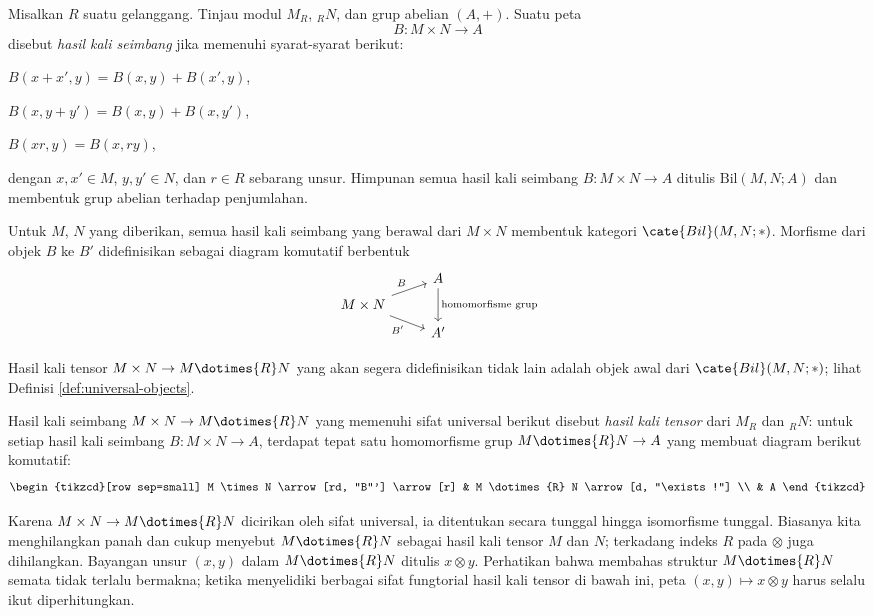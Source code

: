 \begin{definition}\label{def:balanced-product}
	Misalkan $R$ suatu gelanggang. Tinjau modul $M_R$, ${}_R N$, dan grup abelian $(A, +)$. Suatu peta
	\[ B: M \times N \to A \]
	disebut \emph{hasil kali seimbang} jika memenuhi syarat-syarat berikut:
	\begin{compactenum}[(i)]
		\item $B(x+x', y) = B(x, y) + B(x', y)$,
		\item $B(x, y+y') = B(x, y) + B(x, y')$,
		\item $B(xr, y) = B(x, ry)$,
	\end{compactenum}
	dengan $x, x' \in M$, $y, y' \in N$, dan $r \in R$ sebarang unsur. Himpunan semua hasil kali seimbang $B: M \times N \to A$ ditulis $\text{Bil}(M, N; A)$ dan membentuk grup abelian terhadap penjumlahan.
\end{definition}

Untuk $M$, $N$ yang diberikan, semua hasil kali seimbang yang berawal dari $M \times N$ membentuk kategori $\cate{Bil}(M, N; \ast)$. Morfisme dari objek $B$ ke $B'$ didefinisikan sebagai diagram komutatif berbentuk
\[ \begin{tikzcd}[row sep=tiny]
	{} & A \arrow[dd, "\text{homomorfisme grup}"] \\
	M \times N \arrow[ru, "B"] \arrow[rd, "B'"'] & \\
	& A'
\end{tikzcd} \]

Hasil kali tensor $M \times N \to M \dotimes{R} N$ yang akan segera didefinisikan tidak lain adalah objek awal dari $\cate{Bil}(M, N; \ast)$; lihat Definisi \ref{def:universal-objects}.

\begin{definition}\label{def:tensor-product}
	Hasil kali seimbang $M \times N \to M \dotimes{R} N$ yang memenuhi sifat universal berikut disebut \emph{hasil kali tensor} dari $M_R$ dan ${}_R N$: untuk setiap hasil kali seimbang $B: M \times N \to A$, terdapat tepat satu homomorfisme grup $M \dotimes{R} N \to A $ yang membuat diagram berikut komutatif:
	\[ \begin{tikzcd}[row sep=small]
		M \times N \arrow[rd, "B"'] \arrow[r] & M \dotimes{R} N \arrow[d, "\exists!"] \\
		& A
	\end{tikzcd} \]
\end{definition}
Karena $M \times N \to M \dotimes{R} N$ dicirikan oleh sifat universal, ia ditentukan secara tunggal hingga isomorfisme tunggal. Biasanya kita menghilangkan panah dan cukup menyebut $M \dotimes{R} N$ sebagai hasil kali tensor $M$ dan $N$; terkadang indeks $R$ pada $\otimes$ juga dihilangkan. Bayangan unsur $(x, y)$ dalam $M \dotimes{R} N$ ditulis $x \otimes y$. Perhatikan bahwa membahas struktur $M \dotimes{R} N$ semata tidak terlalu bermakna; ketika menyelidiki berbagai sifat fungtorial hasil kali tensor di bawah ini, peta $(x, y) \mapsto x \otimes y$ harus selalu ikut diperhitungkan.


